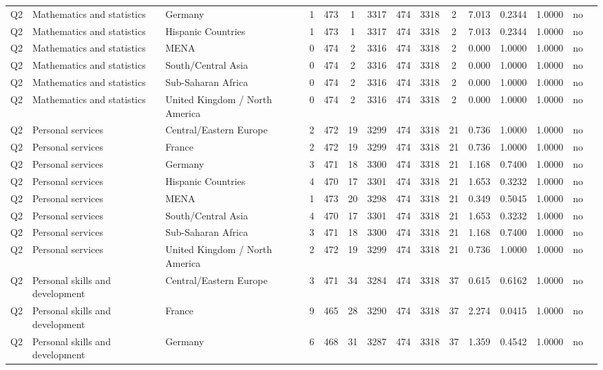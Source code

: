 \begin{longtable}{lllrcccccccccll}
Q2 & Mathematics and statistics & Germany & 1 & 473 & 1 & 3317 & 474 & 3318 & 2 & 7.013 & 0.2344 & 1.0000 & no \\
Q2 & Mathematics and statistics & Hispanic Countries & 1 & 473 & 1 & 3317 & 474 & 3318 & 2 & 7.013 & 0.2344 & 1.0000 & no \\
Q2 & Mathematics and statistics & MENA & 0 & 474 & 2 & 3316 & 474 & 3318 & 2 & 0.000 & 1.0000 & 1.0000 & no \\
Q2 & Mathematics and statistics & South/Central Asia & 0 & 474 & 2 & 3316 & 474 & 3318 & 2 & 0.000 & 1.0000 & 1.0000 & no \\
Q2 & Mathematics and statistics & Sub-Saharan Africa & 0 & 474 & 2 & 3316 & 474 & 3318 & 2 & 0.000 & 1.0000 & 1.0000 & no \\
Q2 & Mathematics and statistics & United Kingdom / North America & 0 & 474 & 2 & 3316 & 474 & 3318 & 2 & 0.000 & 1.0000 & 1.0000 & no \\
Q2 & Personal services & Central/Eastern Europe & 2 & 472 & 19 & 3299 & 474 & 3318 & 21 & 0.736 & 1.0000 & 1.0000 & no \\
Q2 & Personal services & France & 2 & 472 & 19 & 3299 & 474 & 3318 & 21 & 0.736 & 1.0000 & 1.0000 & no \\
Q2 & Personal services & Germany & 3 & 471 & 18 & 3300 & 474 & 3318 & 21 & 1.168 & 0.7400 & 1.0000 & no \\
Q2 & Personal services & Hispanic Countries & 4 & 470 & 17 & 3301 & 474 & 3318 & 21 & 1.653 & 0.3232 & 1.0000 & no \\
Q2 & Personal services & MENA & 1 & 473 & 20 & 3298 & 474 & 3318 & 21 & 0.349 & 0.5045 & 1.0000 & no \\
Q2 & Personal services & South/Central Asia & 4 & 470 & 17 & 3301 & 474 & 3318 & 21 & 1.653 & 0.3232 & 1.0000 & no \\
Q2 & Personal services & Sub-Saharan Africa & 3 & 471 & 18 & 3300 & 474 & 3318 & 21 & 1.168 & 0.7400 & 1.0000 & no \\
Q2 & Personal services & United Kingdom / North America & 2 & 472 & 19 & 3299 & 474 & 3318 & 21 & 0.736 & 1.0000 & 1.0000 & no \\
Q2 & Personal skills and development & Central/Eastern Europe & 3 & 471 & 34 & 3284 & 474 & 3318 & 37 & 0.615 & 0.6162 & 1.0000 & no \\
Q2 & Personal skills and development & France & 9 & 465 & 28 & 3290 & 474 & 3318 & 37 & 2.274 & 0.0415 & 1.0000 & no \\
Q2 & Personal skills and development & Germany & 6 & 468 & 31 & 3287 & 474 & 3318 & 37 & 1.359 & 0.4542 & 1.0000 & no \\

\end{longtable}
